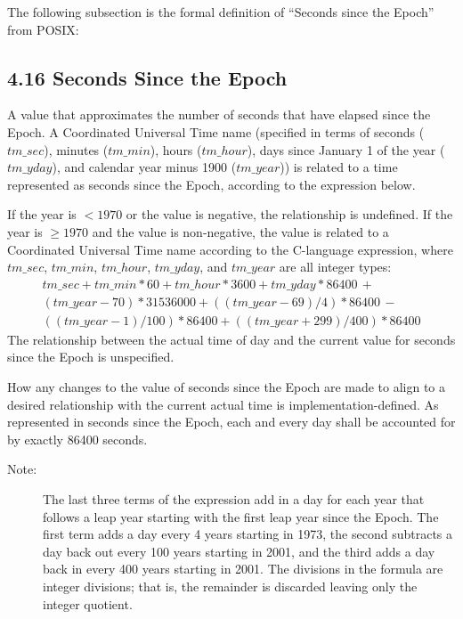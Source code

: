 \documentclass[letterpaper,twoside]{article}
\begin{document}
The following subsection is the formal definition of ``Seconds
since the Epoch'' from POSIX:

\subsection*{4.16 Seconds Since the Epoch}
A value that approximates the number
of seconds that have elapsed
since the Epoch. A Coordinated Universal Time name
(specified in terms of seconds ($tm\_sec$), minutes ($tm\_min$),
hours ($tm\_hour$), days since January 1 of the year ($tm\_yday$),
and calendar year minus 1900 ($tm\_year$)) is related to a time
represented as seconds since the Epoch, according to the expression below.

If the year is $<1970$ or the value is negative, the relationship is
undefined.
If the year is $\geq 1970$ and the value is non-negative, the value is
related to a Coordinated Universal Time name according to the
C-language expression, where $tm\_sec$, $tm\_min$, $tm\_hour$,
$tm\_yday$, and $tm\_year$ are all integer types:
\begin{multline*}
  tm\_sec + tm\_min*60 + tm\_hour*3600 + tm\_yday*86400 \,+ \\
  (tm\_year-70)*31536000 + ((tm\_year-69)/4)*86400 \,- \\
  ((tm\_year-1)/100)*86400 + ((tm\_year+299)/400)*86400
\end{multline*}
The relationship between the actual time of day and the current value
for seconds since the Epoch is unspecified.

How any changes to the value of seconds since the Epoch are made
to align to a desired relationship with the current actual time
is implementation-defined. As represented in seconds since the Epoch,
each and every day shall be accounted for by exactly \num{86400} seconds.

\begin{description}
\item[Note:]
  The last three terms of the expression add in a day for each year
  that follows a leap year starting with the first leap year since
  the Epoch. The first term adds a day every 4 years starting in 1973,
  the second subtracts a day back out every 100 years starting in 2001,
  and the third adds a day back in every 400 years starting in 2001.
  The divisions in the formula are integer divisions; that is, the
  remainder is discarded leaving only the integer quotient.
\end{description}
\end{document}
